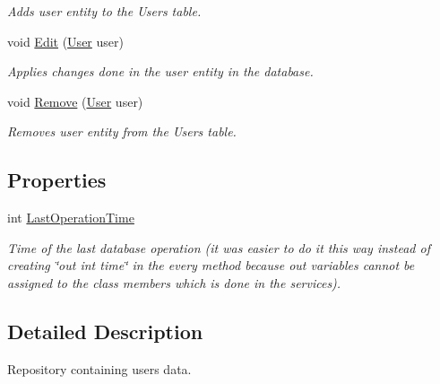 \begin{DoxyCompactItemize}
\begin{DoxyCompactList}\small\item\em Adds user entity to the Users table. \end{DoxyCompactList}\item 
void \mbox{\hyperlink{class_gielda_l2_1_1_i_n_f_r_a_s_t_r_u_c_t_u_r_e_1_1_repositories_1_1_user_repository_a2e07a0a1dd9a6731ed8706b82c66fb49}{Edit}} (\mbox{\hyperlink{class_gielda_l2_1_1_d_b_1_1_entities_1_1_user}{User}} user)
\begin{DoxyCompactList}\small\item\em Applies changes done in the user entity in the database. \end{DoxyCompactList}\item 
void \mbox{\hyperlink{class_gielda_l2_1_1_i_n_f_r_a_s_t_r_u_c_t_u_r_e_1_1_repositories_1_1_user_repository_a8715ce2a146a846905609162c41a6483}{Remove}} (\mbox{\hyperlink{class_gielda_l2_1_1_d_b_1_1_entities_1_1_user}{User}} user)
\begin{DoxyCompactList}\small\item\em Removes user entity from the Users table. \end{DoxyCompactList}\end{DoxyCompactItemize}
\subsection*{Properties}
\begin{DoxyCompactItemize}
\item 
int \mbox{\hyperlink{class_gielda_l2_1_1_i_n_f_r_a_s_t_r_u_c_t_u_r_e_1_1_repositories_1_1_user_repository_aec266d4cd489b911934e5317390c3cc4}{Last\+Operation\+Time}}
\begin{DoxyCompactList}\small\item\em Time of the last database operation (it was easier to do it this way instead of creating \char`\"{}out int time\char`\"{} in the every method because out variables cannot be assigned to the class members which is done in the services). \end{DoxyCompactList}\end{DoxyCompactItemize}


\subsection{Detailed Description}
Repository containing users data. 



